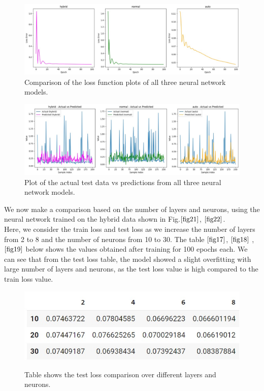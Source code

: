 \documentclass[english,12pt, titlepage]{article}
\begin{document}
	
	
	
	\begin{figure}[!ht]
		\centering
		\includegraphics[width=0.9\linewidth]{fig12.jpeg}
		\caption{Comparison of the loss function plots of all three neural network models.}\label{fig20}
	\end{figure}
	
	
	\begin{figure}[!ht]
		\centering
		\includegraphics[width=0.9\linewidth]{fig17.jpeg}
		\caption{Plot of the actual test data vs predictions from all three neural network models.}\label{fig30}
	\end{figure}
	
	
	We now make a comparison based on the number of layers and neurons, using the neural network trained on the hybrid data shown in Fig.$\ref{fig21}$, $\ref{fig22}$.\\
	Here, we consider the train loss and test loss as we increase the number of layers from 2 to 8 and the number of neurons from 10 to 30. The table $\ref{fig17}$, $\ref{fig18}$ ,$\ref{fig19}$ below shows the values obtained after training for 100 epochs each. We can see that from the test loss table, the model showed a slight overfitting with large number of layers and neurons, as the test loss value is high compared to the train loss value.
	
	
	\begin{figure}[!ht]
		\centering
		\includegraphics[width=0.7\linewidth]{fig13.jpeg}
		\label{fig21}
		\caption{Table shows the test loss comparison over different layers and neurons.}
	\end{figure}
	
\end{document}
